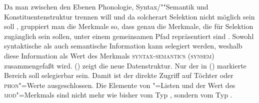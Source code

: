 Da man zwischen den Ebenen Phonologie, Syntax/""Semantik und Konstituentenstruktur trennen will
und da solcherart Selektion nicht möglich sein soll \citep[--144]{ps}, gruppiert man die Merkmale so,
dass genau die Merkmale, die für Selektion zugänglich sein sollen,
unter einem gemeinsamen Pfad repräsentiert sind \citep[]{ps2}.
Sowohl syntaktische als auch semantische Information kann selegiert werden, weshalb diese
Information als Wert des Merkmals \textsc{syntax-semantics} (\textsc{synsem}) zusammengefaßt wird. ()
zeigt die neue Datenstruktur.
Nur der in () markierte Bereich soll selegierbar sein. Damit ist der direkte
Zugriff auf Töchter oder \textsc{phon}"=Werte ausgeschlossen. Die Elemente von \subcat{}"=Listen
und der Wert des \textsc{mod}"=Merkmals sind nicht mehr wie bisher vom Typ , sondern vom Typ
.
\ea
{}
\z
%

